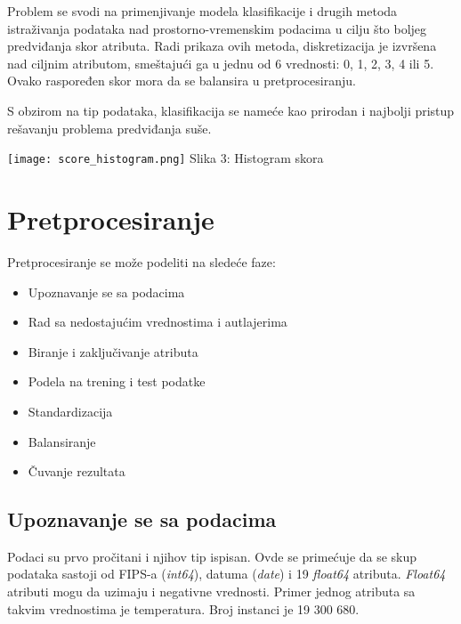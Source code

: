 \documentclass[a4paper]{article}
\begin{document}
{\begin{minipage}{0.6\textwidth}
Problem se svodi na primenjivanje modela klasifikacije i drugih metoda istraživanja podataka nad prostorno-vremenskim podacima u cilju što boljeg predviđanja skor atributa. Radi prikaza ovih metoda, diskretizacija je izvršena nad ciljnim atributom, smeštajući ga u jednu od 6 vrednosti: 0, 1, 2, 3, 4 ili 5. Ovako raspoređen skor mora da se balansira u pretprocesiranju.

S obzirom na tip podataka, klasifikacija se nameće kao prirodan i najbolji pristup rešavanju problema predviđanja suše.
\end{minipage}
\begin{minipage}{0.05\textwidth}
\hphantom{a}
\end{minipage}
\begin{minipage}{0.5\textwidth}
\texttt{[image: score\_histogram.png]}
\hphantom{aaaaaaaaa}Slika 3: Histogram skora\\
\end{minipage}

\section{Pretprocesiranje}

Pretprocesiranje se može podeliti na sledeće faze:
\begin{itemize}
\item Upoznavanje se sa podacima
\item Rad sa nedostajućim vrednostima i autlajerima
\item Biranje i zaključivanje atributa
\item Podela na trening i test podatke
\item Standardizacija
\item Balansiranje
\item Čuvanje rezultata
\end{itemize} 

\subsection{Upoznavanje se sa podacima}
\label{upoznavanje_se_sa_podacima}

Podaci su prvo pročitani i njihov tip ispisan. Ovde se primećuje da se skup podataka sastoji od FIPS-a ({\em int64}), datuma ({\em date}) i 19 {\em float64} atributa. {\em Float64} atributi mogu da uzimaju i negativne vrednosti. Primer jednog atributa sa takvim vrednostima je temperatura. Broj instanci je 19 300 680.\\

}
\end{document}
